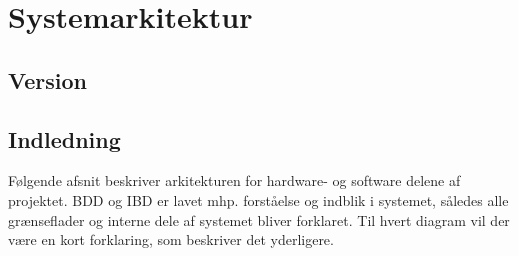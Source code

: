 \chapter{Systemarkitektur}

\section*{Version}

\section{Indledning}
Følgende afsnit beskriver arkitekturen for hardware- og software delene af projektet. BDD og IBD er lavet mhp. forståelse og indblik i systemet, således alle grænseflader og interne dele af systemet bliver forklaret. Til hvert diagram vil der være en kort forklaring, som beskriver det yderligere.





\clearpage